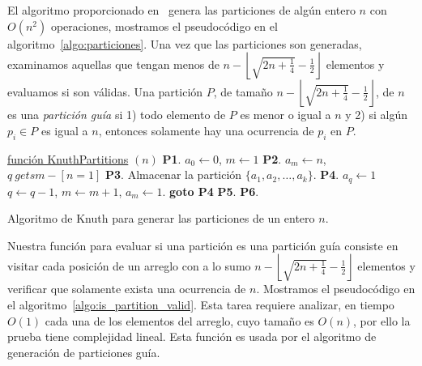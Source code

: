     El algoritmo proporcionado en~\cite{Knuth2011} genera las particiones de algún entero
    $n$ con $O(n^2)$ operaciones, mostramos el pseudocódigo en el
    algoritmo~\ref{algo:particiones}. Una vez que las particiones son generadas,
    examinamos aquellas que tengan menos de $n - \left\lfloor\sqrt{2n + \frac{1}{4}} -
    \frac{1}{2}\right\rfloor$ elementos y evaluamos si son válidas. Una partición $P$, de
    tamaño $n -\left\lfloor\sqrt{2n + \frac{1}{4}} - \frac{1}{2}\right\rfloor$, de $n$ es
    una \emph{partición guía} si 1) todo elemento de $P$ es menor o igual a $n$ y 2) si algún $p_i\in P$ es
    igual a $n$, entonces solamente hay una ocurrencia de $p_i$ en $P$.
    \begin{algorithm}[htpb]
      \DontPrintSemicolon
      \underline{función KnuthPartitions} $(n)$\;
      \textbf{P1}. $a_0 \gets 0$, $m\gets 1$\;
      \textbf{P2}. $a_m \gets n$, $q \ gets m - [n=1]$\;
      \textbf{P3}. Almacenar la partición $\{a_1,a_2,\dots,a_k\}$.\;
      \textbf{P4}. $a_q \gets 1$ $q \gets q-1$, $m \gets m+1$, $a_m \gets 1$.\;
      \textbf{goto P4}\;
      \textbf{P5}. 
      \textbf{P6}. 
      \caption{Algoritmo de Knuth para generar las particiones de un entero $n$.}
      \label{algo:particiones}
    \end{algorithm}

    Nuestra función para evaluar si una partición es una partición guía consiste en visitar
    cada posición de un arreglo con a lo sumo $n - \left\lfloor\sqrt{2n + \frac{1}{4}} -
    \frac{1}{2}\right\rfloor$ elementos y verificar que solamente exista una ocurrencia
    de $n$. Mostramos el pseudocódigo en el algoritmo~\ref{algo:is_partition_valid}. Esta tarea
    requiere analizar, en tiempo $O(1)$ cada una de los elementos del arreglo, cuyo tamaño es
    $O(n)$, por ello la prueba tiene complejidad lineal. Esta función es usada por el
    algoritmo de generación de particiones guía.

